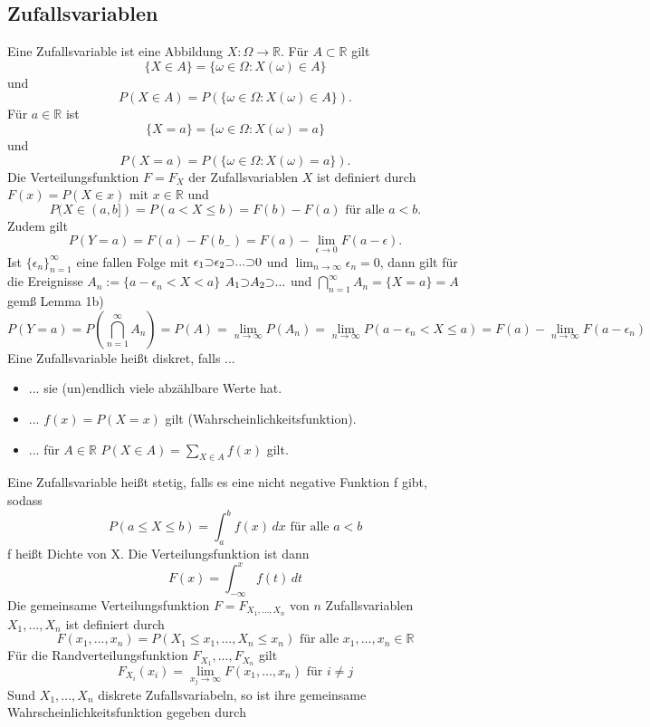 \documentclass[a4paper,12pt]{article}
\begin{document}
\subsection{Zufallsvariablen}
Eine Zufallsvariable ist eine Abbildung $X: \Omega \to \mathbb{R}$. Für $ A \subset \mathbb{R} $ gilt 
$$ \{ X \in A \} = \{ \omega \in \Omega : X(\omega) \in A \} $$
und 
$$ P(X \in A) = P \left( \{ \omega \in \Omega : X(\omega) \in A \} \right). $$
Für $a \in \mathbb{R}$ ist 
$$
\{ X=a \} = \{ \omega \in \Omega: X(\omega) = a \}
$$
und 
$$
P(X=a) = P \left( \{\omega \in \Omega: X(\omega) = a \} \right)
.$$
Die Verteilungsfunktion $F=F_X$ der Zufallsvariablen $X$ ist definiert durch $F(x) = P(X\in x)$ mit $x \in \mathbb{R}$ und 
$$
P(X \in (a,b]) = P(a < X \leq b) = F(b) - F(a) \text{ für alle } a<b
.$$
Zudem gilt 
$$
P(Y=a) =F(a) - F(b_-) =F(a) - \lim_{\epsilon \to 0}F(a-\epsilon)
.$$
Ist $\{\epsilon_n \}_{n=1}^\infty$ eine fallen Folge mit $\epsilon_1 \reflectbox{$\subset$} \epsilon_2 \reflectbox{$\subset$} ... \reflectbox{$\subset$} 0$ und $\lim_{n \to \infty}\epsilon_n = 0$, dann gilt für die Ereignisse $A_n:= \{ a- \epsilon_n < X < a\}$
$A_1 \reflectbox{$\subset$} A_2 \reflectbox{$\subset$}  ...$ und $\bigcap_{n=1}^\infty A_n = \{X=a\} = A$ gemß Lemma 1b)
$$
P(Y=a) = P\left( \bigcap_{n=1}^\infty A_n   \right) = P(A) = \lim_{n \to \infty} P(A_n) = \lim_{n \to \infty} P(a - \epsilon_n < X \leq a)  = F(a) - \lim_{n \to \infty}F(a-\epsilon_n)
$$
Eine Zufallsvariable heißt diskret, falls ...  
\begin{itemize}
    \item ... sie (un)endlich viele abzählbare Werte hat.
    \item ... $f(x) = P(X=x)$ gilt (Wahrscheinlichkeitsfunktion).
    \item ... für $A \in \mathbb{R}$ $P(X \in A) = \sum_{X \in A}f(x)$ gilt.
\end{itemize}
Eine Zufallsvariable heißt stetig, falls es eine nicht negative Funktion f gibt, sodass
$$
P(a \leq X \leq b) = \int_{a}^{b}f(x) \,dx \text{ für alle } a < b
$$
f heißt Dichte von X. Die Verteilungsfunktion ist dann
$$
F(x) = \int_{- \infty}^{x} f(t) \,dt
$$
Die gemeinsame Verteilungsfunktion $F=F_{X_1, ..., X_n}$ von $n$ Zufallsvariablen $X_1, ..., X_n$ ist definiert durch
$$
F(x_1, ..., x_n) = P(X_1 \leq x_1, ..., X_n \leq x_n) \text{ für alle } x_1, ..., x_n \in \mathbb{R}
$$
Für die Randverteilungsfunktion $F_{X_1}, ..., F_{X_n}$ gilt 
$$
F_{X_i}(x_i) = \lim_{x_j \to \infty} F(x_1, ..., x_n) \text{ für } i \neq j
$$
Sund $X_1, ..., X_n$ diskrete Zufallsvariabeln, so ist ihre gemeinsame Wahrscheinlichkeitsfunktion gegeben durch
\end{document}
